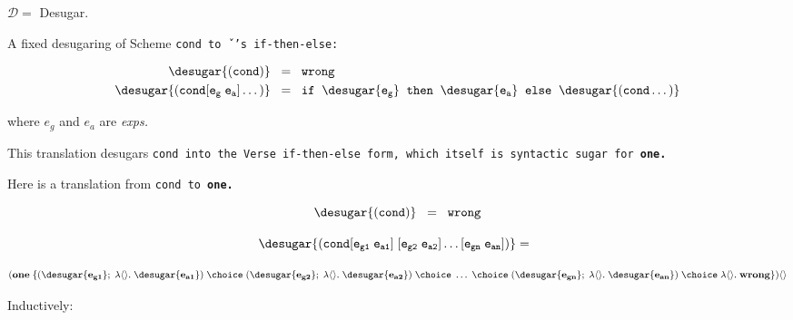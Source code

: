 \documentclass[]{article}
\begin{document}
$\mathcal{D} =$ Desugar.

\bigskip

A fixed desugaring of Scheme \tt{cond} to \textit{\v}'s \texttt{if-then-else}: 

\begin{align*}
  \desugar{\tt{(cond)}} \;\; & = \;\; \tt{wrong} \\
\desugar{\tt{(cond [} e_g \; e_a \tt{] \dots)}} \;\; 
& = \;\; \tt{if} \;\; \desugar{e_g}  \;\; \tt{then} \;\; \desugar{e_a} \;\; 
  \tt{else} \;\; \desugar{\tt{(cond \dots)}} \\
\end{align*}

where $e_g$ and $e_a$ are \it{exp}s.

\bigskip


This translation desugars \tt{cond} into the Verse \tt{if-then-else} form, 
which itself is syntactic sugar for \bf{one}. 

\medskip

Here is a translation from \tt{cond} to \bf{one}. 

$$ \desugar{\tt{(cond)}} \;\;  = \;\; \tt{wrong} $$

$$ \desugar{\tt{(cond [} e_{g1} \; e_{a1}\tt{]} \; \tt{[}e_{g2} \; e_{a2} 
   \tt{] \dots [}e_{gn} \; e_{an}\tt{] )}}
  = \;\; 
$$


$$
(\bf{one} \; \{(\desugar{e_{g1}} ; \; \lambda\langle\rangle.\; \desugar{e_{a1}}) \; \choice \; 
(\desugar{e_{g2}} ; \;\lambda\langle\rangle.\; \desugar{e_{a2}}) \; \choice \; \dots \; \choice \; (\desugar{e_{gn}} ; \;\lambda\langle\rangle.\; \desugar{e_{an}}) \; 
\choice \; \lambda\langle\rangle.\;\bf{wrong} \})\langle\rangle  \\
$$  


Inductively: 
\end{document}
